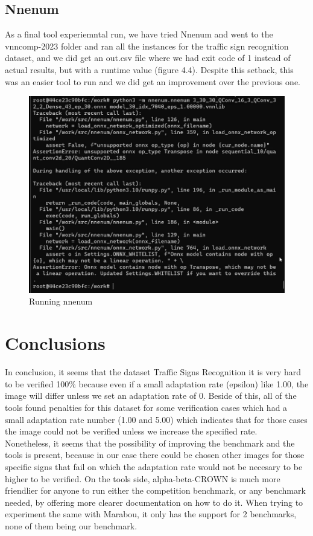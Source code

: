 \documentclass[12pt,a4paper]{report}
\newcommand\tab[1][5mm]{\hspace*{#1}}
\begin{document}
\section{Nnenum}
\tab As a final tool experiemntal run, we have tried Nnenum and went to the vnncomp-2023 folder and ran all the instances for the traffic sign recognition dataset, and we did get an out.csv file where we had exit code of 1 instead of actual results, but with a runtime value (figure 4.4). Despite this setback, this was an easier tool to run and we did get an improvement over the previous one.
\begin{figure}[h]
\centering
\includegraphics[scale=0.6]{nnenum_error1.png}
\caption{Running nnenum}
\end{figure}

\chapter{Conclusions}
\tab In conclusion, it seems that the dataset Traffic Signs Recognition\cite{traffic_signs_recognition} it is very hard to be verified 100\% because even if a small adaptation rate (epsilon) like 1.00, the image will differ unless we set an adaptation rate of 0. Beside of this, all of the tools found penalties for this dataset for some verification cases which had a small adaptation rate number (1.00 and 5.00) which indicates that for those cases the image could not be verified unless we increase the specified rate.\\
\tab Nonetheless, it seems that the possibility of improving the benchmark and the tools is present, because in our case there could be chosen other images for those specific signs that fail on which the adaptation rate would not be necesary to be higher to be verified. On the tools side, alpha-beta-CROWN is much more friendlier for anyone to run either the competition benchmark, or any benchmark needed, by offering more clearer documentation on how to do it. When trying to experiment the same with Marabou, it only has the support for 2 benchmarks, none of them being our benchmark.



\end{document}
